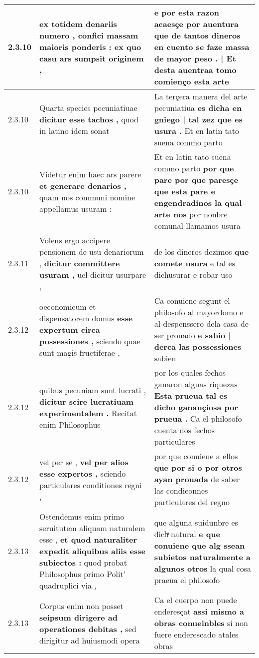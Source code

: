 \begin{tabular}{|p{1cm}|p{6.5cm}|p{6.5cm}|}
2.3.10 & ex totidem denariis numero , \textbf{ confici massam maioris ponderis : } ex quo casu ars sumpsit originem , & e por esta razon acaesçe por auentura \textbf{ que de tantos dineros en cuento se faze massa de mayor peso . | Et desta } auentraa tomo comienço esta arte \\\hline
2.3.10 & Quarta species pecuniatiuae \textbf{ dicitur esse tachos , } quod in latino idem sonat & La terçera manera del arte pecuniatiua \textbf{ es dicha en gniego | tal zez que es usura . } Et en latin tato suena commo parto \\\hline
2.3.10 & Videtur enim haec ars parere \textbf{ et generare denarios , } quam nos communi nomine appellamus usuram : & Et en latin tato suena commo parto \textbf{ por que pare por que paresçe que esta pare e engendradinos la qual arte nos } por nonbre comunal llamamos usura \\\hline
2.3.11 & Volens ergo accipere pensionem de usu denariorum , \textbf{ dicitur committere usuram , } uel dicitur usurpare , & de los dineros dezimos \textbf{ que comete usura } e tal es dichusurar e robar uso \\\hline
2.3.12 & oeconomicum et dispensatorem domus \textbf{ esse expertum circa possessiones , } sciendo quae sunt magis fructiferae , & Ca conuiene segunt el philosofo al mayordomo e al despenssero dela casa de ser prouado \textbf{ e sabio | derca las possessiones } sabien \\\hline
2.3.12 & quibus pecuniam sunt lucrati , \textbf{ dicitur scire lucratiuam experimentalem . } Recitat enim Philosophus & por los quales fechos ganaron alguas riquezas \textbf{ Esta prueua tal es dicho ganançiosa por prueua . } Ca el philosofo cuenta dos fechos particulares \\\hline
2.3.12 & vel per se , \textbf{ vel per alios esse expertos , } sciendo particulares conditiones regni , & por que conuiene a ellos \textbf{ que por si o por otros ayan prouada } de saber las condiconnes particulares del regno \\\hline
2.3.13 & Ostendemus enim primo seruitutem aliquam naturalem esse , \textbf{ et quod naturaliter expedit aliquibus aliis esse subiectos : } quod probat Philosophus primo Polit’ quadruplici via , & que alguna suidunbre es dichͣ natural \textbf{ e que conuiene que alg ssean subietos naturalmente a algunos otros } la qual cosa praeua el philosofo \\\hline
2.3.13 & Corpus enim non posset \textbf{ seipsum dirigere ad operationes debitas , } sed dirigitur ad huiusmodi opera & Ca el cuerpo non puede enderesçat \textbf{ assi mismo a obras conueinbles } si non fuere enderescado atales obras \\\hline

\end{tabular}
